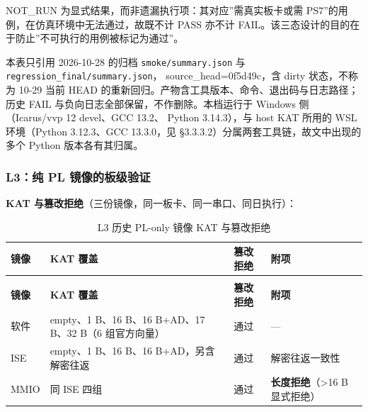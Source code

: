 NOT\_RUN 为显式结果，而非遗漏执行项：其对应''需真实板卡或需 PS7''的用例，在仿真环境中无法通过，故既不计 PASS 亦不计 FAIL。该三态设计的目的在于防止''不可执行的用例被标记为通过''。

本表只引用 2026-10-28 的归档 \texttt{smoke/\allowbreak{}summary.\allowbreak{}json} 与 \texttt{regression\_\allowbreak{}final/\allowbreak{}summary.\allowbreak{}json}， source\_head=0f5d49c，含 dirty 状态，不称为 10-29 当前 HEAD 的重新回归。产物含工具版本、命令、退出码与日志路径；历史 FAIL 与负向日志全部保留，不作删除。本档运行于 Windows 侧（Icarus/vvp 12 devel、GCC 13.2、 Python 3.14.3），与 host KAT 所用的 WSL 环境（Python 3.12.3、GCC 13.3.0，见 §3.3.3.2）分属两套工具链，故文中出现的多个 Python 版本各有其归属。

\Needspace{85pt}

\subsubsection{L3：纯 PL 镜像的板级验证}\label{l3ux7eaf-pl-ux955cux50cfux7684ux677fux7ea7ux9a8cux8bc1}

\textbf{KAT 与篡改拒绝}（三份镜像，同一板卡、同一串口、同日执行）：

{\small
\setlength{\tabcolsep}{4pt}
\renewcommand{\thetable}{3-10}
\begin{longtable}{@{}>{\raggedright\arraybackslash}p{}>{\raggedright\arraybackslash}p{}>{\raggedright\arraybackslash}p{}>{\raggedright\arraybackslash}p{}@{}}
\caption{L3 历史 PL-only 镜像 KAT 与篡改拒绝}\label{tab:3-10}\\
\toprule
\textbf{镜像} & \textbf{KAT 覆盖} & \textbf{篡改拒绝} & \textbf{附项} \\
\midrule
\endfirsthead
\multicolumn{4}{@{}l}{\footnotesize 续表 3-10}\\
\toprule
\textbf{镜像} & \textbf{KAT 覆盖} & \textbf{篡改拒绝} & \textbf{附项} \\
\midrule
\endhead
软件 & empty、1 B、16 B、16 B+AD、17 B、32 B（6 组官方向量） & 通过 & --- \\
ISE & empty、1 B、16 B、16 B+AD，另含解密往返 & 通过 & 解密往返一致性 \\
MMIO & 同 ISE 四组 & 通过 & \textbf{长度拒绝}（>16 B 显式拒绝） \\
\bottomrule
\end{longtable}
}

